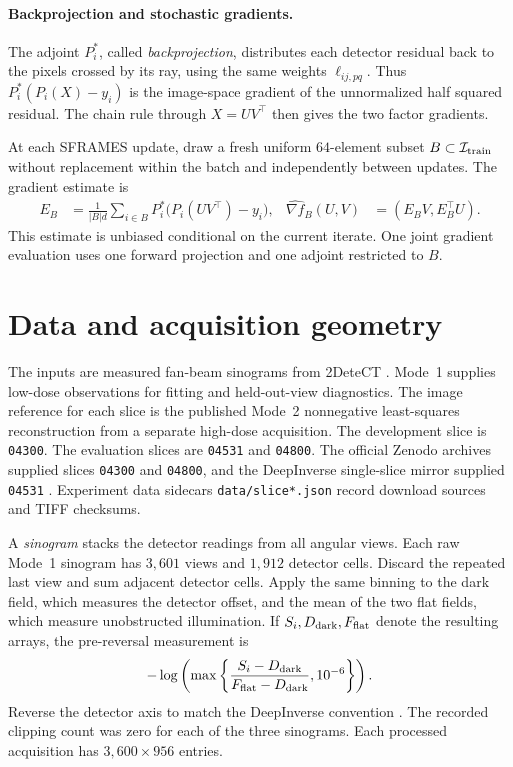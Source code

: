 \documentclass[11pt]{article}
\begin{document}
\paragraph{Backprojection and stochastic gradients.}
The adjoint \(P_i^\ast\), called \emph{backprojection}, distributes each detector residual back to the pixels crossed by its ray, using the same weights \(\ell_{ij,pq}\). Thus \(P_i^\ast(P_i(X)-y_i)\) is the image-space gradient of the unnormalized half squared residual. The chain rule through \(X=UV^\top\) then gives the two factor gradients.

At each SFRAMES update, draw a fresh uniform \(64\)-element subset \(B\subset\mathcal I_{\rm train}\) without replacement within the batch and independently between updates. The gradient estimate is
\begin{align}
  E_B &= \frac{1}{|B|d}\sum_{i\in B} P_i^\ast\bigl(P_i(UV^\top)-y_i\bigr),
  &
  \widehat{\nabla f}_B(U,V)&=(E_B V,E_B^\top U).
  \label{eq:ct-gradient}
\end{align}
This estimate is unbiased conditional on the current iterate. One joint gradient evaluation uses one forward projection and one adjoint restricted to \(B\).

\section{Data and acquisition geometry}
\label{sec:ct-data}

The inputs are measured fan-beam sinograms from 2DeteCT \cite{detect}. Mode~1 supplies low-dose observations for fitting and held-out-view diagnostics. The image reference for each slice is the published Mode~2 nonnegative least-squares reconstruction from a separate high-dose acquisition. The development slice is \texttt{04300}. The evaluation slices are \texttt{04531} and \texttt{04800}. The official Zenodo archives supplied slices \texttt{04300} and \texttt{04800}, and the DeepInverse single-slice mirror supplied \texttt{04531} \cite{deepinv}. Experiment data sidecars \texttt{data/slice*.json} record download sources and TIFF checksums.

A \emph{sinogram} stacks the detector readings from all angular views. Each raw Mode~1 sinogram has \(3{,}601\) views and \(1{,}912\) detector cells. Discard the repeated last view and sum adjacent detector cells. Apply the same binning to the dark field, which measures the detector offset, and the mean of the two flat fields, which measure unobstructed illumination. If \(S_i,D_{\rm dark},F_{\rm flat}\) denote the resulting arrays, the pre-reversal measurement is
\[
  -\log\left(\max\left\{\frac{S_i-D_{\rm dark}}{F_{\rm flat}-D_{\rm dark}},10^{-6}\right\}\right).
\]
Reverse the detector axis to match the DeepInverse convention \cite{deepinv}. The recorded clipping count was zero for each of the three sinograms. Each processed acquisition has \(3{,}600\times956\) entries.
\end{document}
